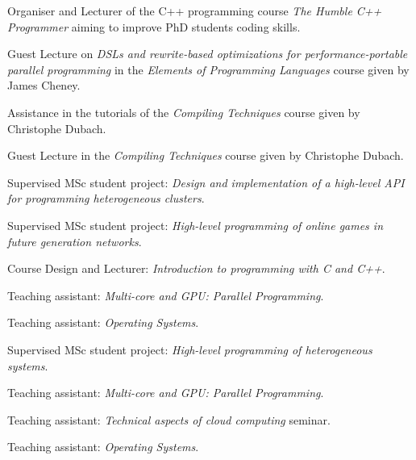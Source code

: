 \begin{cvitemize}[\small 2015 - 2016]
    \item Organiser and Lecturer of the C++ programming course \emph{The Humble C++ Programmer} aiming to improve PhD students coding skills.
    \item Guest Lecture on \emph{\small DSLs and rewrite-based optimizations for performance-portable parallel programming} in the \emph{Elements of Programming Languages} course given by James Cheney.
    \item Assistance in the tutorials of the \emph{Compiling Techniques} course given by Christophe Dubach.
\end{cvitemize}

\begin{cvitemize}[\small 2014 - 2015]
    \item Guest Lecture in the \emph{Compiling Techniques} course given by Christophe Dubach.
\end{cvitemize}


\begin{cvitemize}[\small 2013 - 2014]
  \item Supervised MSc student project:
        \emph{Design and implementation of a high-level API for programming heterogeneous clusters}.
    \item Supervised MSc student project:
        \emph{High-level programming of online games in future generation networks}.
\end{cvitemize}

\begin{cvitemize}[\small 2012 - 2013]
    \item  Course Design and Lecturer:
        \emph{Introduction to programming with C and C++}.
      \item    Teaching assistant:
        \emph{Multi-core and GPU\@: Parallel Programming}.
    \item Teaching assistant:
        \emph{Operating Systems}.
\end{cvitemize}

\begin{cvitemize}[\small 2011 - 2012]
    \item Supervised MSc student project:
        \emph{High-level programming of heterogeneous systems}.
      \item Teaching assistant:
        \emph{Multi-core and GPU\@: Parallel Programming}.
    \item Teaching assistant:
        \emph{Technical aspects of cloud computing} seminar.
      \item Teaching assistant:
        \emph{Operating Systems}.
\end{cvitemize}

